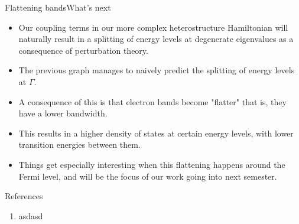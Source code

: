 \documentclass[9pt]{beamer}
\begin{document}
\begin{frame}{Flattening bands}{What's next}
  \begin{itemize}


    \item Our coupling terms in our more complex heterostructure Hamiltonian will naturally result in a splitting of energy levels at degenerate eigenvalues as a consequence of perturbation theory.

    \item The previous graph manages to naively predict the splitting of energy levels at $\Gamma$.

    \item A consequence of this is that electron bands become "flatter" that is, they have a lower bandwidth.

    \item This results in a higher density of states at certain energy levels, with lower transition energies between them.

    \item Things get especially interesting when this flattening happens around the Fermi level, and will be the focus of our work going into next semester.
  \end{itemize}
\end{frame}

\begin{frame}{References}
  \begin{enumerate}
      \item asdasd
  \end{enumerate}
\end{frame}
\end{document}
